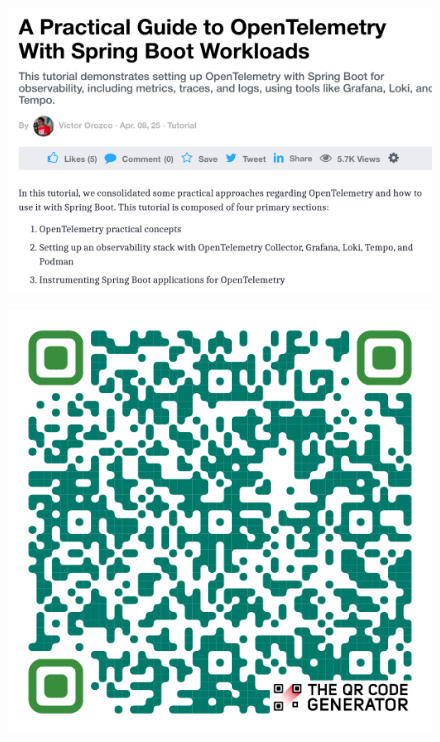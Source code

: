 \documentclass[aspectratio=169]{beamer}
\begin{document}
\begin{frame}
\begin{columns}
			\begin{column}{0.5\textwidth}
				\begin{figure}
					\centering
					\includegraphics[width=0.7\linewidth]{Images/dzoneotel}
					\label{fig:dzoneotel}
				\end{figure}
\begin{figure}
	\centering
	\includegraphics[width=0.4\linewidth]{Images/QR.png}
	\label{fig:qrdzone}
\end{figure}
			\end{column}
		\end{columns}
		
		
		
	\end{frame}
\end{document}
